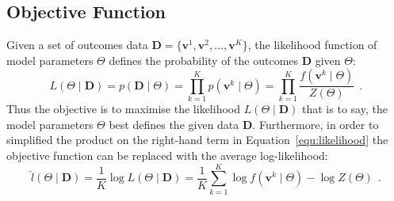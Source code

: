 \subsection{Objective Function}
Given a set of outcomes data $ \mathbf{D}=\{\mathbf{v}^1, \mathbf{v}^2, ..., \mathbf{v}^K\} $, the likelihood function of model parameters $\Theta$ defines the probability of the outcomes $ \mathbf{D}$ given $\Theta$:
\begin{equation}
L (\Theta \mid \mathbf{D}) = p(\mathbf{D} \mid \Theta ) = \prod_{k=1}^K p(\mathbf{v}^k \mid \Theta ) =  \prod_{k=1}^K\dfrac{f(\mathbf{v}^k \mid \Theta )}{Z( \Theta)}~~.
\label{equ:likelihood}
\end{equation}
Thus the objective is to maximise the likelihood $L (\Theta \mid \mathbf{D})$ that is to say, the model parameters $ \Theta $ best defines the given data $\mathbf{D}$.
Furthermore, in order to simplified the product on the right-hand term in Equation~\ref{equ:likelihood} the objective function can be replaced with the average log-likelihood:
\begin{equation}
\label{equ:like}
\hat{l} (\Theta \mid \mathbf{D}) =\frac{1}{K}\log  L (\Theta \mid \mathbf{D}) 
=\frac{1}{K}\sum_{k=1}^K\log f(\mathbf{v}^k \mid \Theta ) - \log Z( \Theta)~~.
\end{equation}

%
%


%

